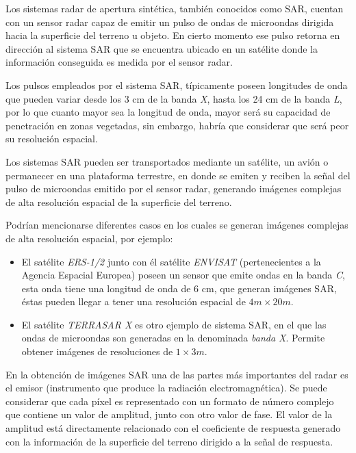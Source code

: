 Los sistemas radar de apertura sintética, también conocidos como SAR, cuentan con un sensor radar capaz de emitir un pulso de ondas de microondas dirigida hacia la superficie del terreno u objeto. En cierto momento ese pulso retorna en dirección al sistema SAR que se encuentra ubicado en un satélite donde la información conseguida es medida por el sensor radar. 

Los pulsos empleados por el sistema SAR, típicamente poseen longitudes de onda que pueden variar desde los 3 cm de la banda \textit{X}, hasta los 24 cm de la banda \textit{L}, por lo que cuanto mayor sea la longitud de onda, mayor será su capacidad de penetración en zonas vegetadas, sin embargo, habría que considerar que será peor su resolución espacial.

Los sistemas SAR pueden ser transportados mediante un satélite, un avión o permanecer en una plataforma terrestre, en donde se emiten y reciben la señal del pulso de microondas emitido por el sensor radar, generando imágenes complejas de alta resolución espacial de la superficie del terreno.

Podrían mencionarse diferentes casos en los cuales se generan imágenes complejas de alta resolución espacial, por ejemplo:
\begin{itemize}
\item El satélite \textit{ERS-1/2} \cite{Wolff2022Dec} junto con él satélite \textit{ENVISAT} (pertenecientes a la Agencia Espacial Europea) poseen un sensor que emite ondas en la banda \textit{C}, esta onda tiene una longitud de onda de 6 cm, que generan imágenes SAR, éstas pueden llegar a tener una resolución espacial de $ 4 m \times 20 m$.
\item El satélite \textit{TERRASAR X} \cite{TerraSAR} es otro ejemplo de sistema SAR, en el que las ondas de microondas son generadas en la denominada \textit{banda X}. Permite obtener imágenes de resoluciones de $1 \times 3 m$.
\end{itemize}


En la obtención de imágenes SAR una de las partes más importantes del radar es el emisor (instrumento que produce la radiación electromagnética). Se puede considerar que cada píxel es representado con un formato de número complejo que contiene un valor de amplitud, junto con otro valor de fase. El valor de la amplitud está directamente relacionado con el coeficiente de respuesta generado con la información de la superficie del terreno dirigido a la señal de respuesta\cite{RigoRibas2004}.

